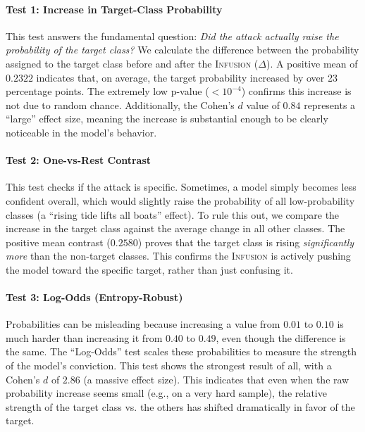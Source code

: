 \documentclass{article}
\theoremstyle{plain}
\theoremstyle{definition}
\theoremstyle{remark}
\begin{document}
\paragraph{Test 1: Increase in Target-Class Probability}
This test answers the fundamental question: \textit{Did the attack actually raise the probability of the target class?} We calculate the difference between the probability assigned to the target class before and after the \textsc{Infusion} ($\Delta$). A positive mean of $0.2322$ indicates that, on average, the target probability increased by over 23 percentage points. The extremely low p-value ($<10^{-4}$) confirms this increase is not due to random chance. Additionally, the Cohen's $d$ value of $0.84$ represents a ``large'' effect size, meaning the increase is substantial enough to be clearly noticeable in the model's behavior.

\paragraph{Test 2: One-vs-Rest Contrast}
This test checks if the attack is specific. Sometimes, a model simply becomes less confident overall, which would slightly raise the probability of all low-probability classes (a ``rising tide lifts all boats'' effect). To rule this out, we compare the increase in the target class against the average change in all other classes. The positive mean contrast ($0.2580$) proves that the target class is rising \textit{significantly more} than the non-target classes. This confirms the \textsc{Infusion} is actively pushing the model toward the specific target, rather than just confusing it.

\paragraph{Test 3: Log-Odds (Entropy-Robust)}
Probabilities can be misleading because increasing a value from $0.01$ to $0.10$ is much harder than increasing it from $0.40$ to $0.49$, even though the difference is the same. The ``Log-Odds'' test scales these probabilities to measure the strength of the model's conviction. This test shows the strongest result of all, with a Cohen's $d$ of $2.86$ (a massive effect size). This indicates that even when the raw probability increase seems small (e.g., on a very hard sample), the relative strength of the target class vs. the others has shifted dramatically in favor of the target.
\end{document}
